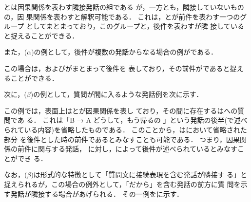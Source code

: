 とは因果関係を表わす隣接発話の組である
が，一方とも，隣接していないものの，因
果関係を表わすと解釈可能である．
これは，とが前件を表わす一つのグループ
としてまとまっており，このグループと，後件を表わすが隣
接していると捉えることができる．

また，($\alpha$)の例として，後件が複数の発話からなる場合の例がである．


この場合は，およびがまとまって後件を
表しており，その前件がであると捉えることができる．

次に，($\beta$)の例として，質問が間に入るような発話例を次に示す．


この例では，表面上はとが因果関係を表し
ており，その間に存在するはへの質問であ
る．
これは「B → A どうして，もう帰るの \ua 」という発話の後半(で述べられている内容)を省略したものである．
このことから，はにおいて省略された部分
を後件とした時の前件であるとみなすことも可能である．
つまり，因果関係の前件に関与する発話，
に対し，によって後件が述べられているとみなすことができ
る．

なお，($\beta$)は形式的な特徴として「質問文に接続表現を含む発話が隣接す
る」と捉えられるが，この場合の例外として，「だから」を含む発話の前方に質
問を示す発話が隣接する場合があげられる．
その一例をに示す．

